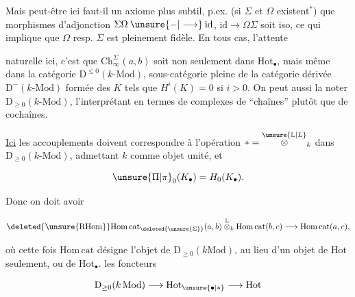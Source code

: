 
Mais peut-être ici faut-il un axiome plus subtil, p.ex. (si $\Sigma$  et $\Omega$ existent$^{*}$) que   morphismes d'adjonction $\Sigma\Omega\mathbin{\unsure{-|\longrightarrow}}\mathrm{id}$, $\mathrm{id}\longrightarrow\Omega\Sigma$ soit iso, ce qui implique que $\Omega$ resp. $\Sigma$ est pleinement fidèle.  En tous cas, l'attente


naturelle ici, c'est que $\mathrm{Ch}_{\infty}^{\Sigma}(a,b)$ soit non seulement dans $\mathrm{Hot}_{\bullet}$, mais même dans la catégorie   $\mathrm{D}^{\leq 0}(k\text{-}\mathrm{Mod})$, sous-catégorie pleine de la catégorie dérivée $\mathrm D^{-}(k\text{-}\mathrm{Mod})$ formée des $K$ tels que $H^i(K)=0$ si $i>0$. On peut aussi la noter $\mathrm D_{\geq 0}(k\text{-}\mathrm{Mod})$, l'interprétant en termes de complexes de ``chaînes'' plutôt que de cochaînes. 

\uline{Ici} les accouplements doivent correspondre à l'opération $*=\overset{\unsure{\mathbb L|L}}{\otimes}_{k}$ dans $\mathrm D_{\geq 0}(k\text{-}\mathrm{Mod})$, admettant $k$ comme objet unité, et

\[
 \unsure{\Pi|\pi}_0(K_\bullet)=H_0(K_\bullet).
\]

Donc on doit avoir 

\[
 \deleted{\unsure{\mathrm{RHom}}}\mathrm{Hom\,cat}_{\deleted{\unsure{\Sigma}}}(a,b)
 \overset{\mathbb L}{\otimes}_k\mathrm{Hom\,cat}(b,c)\longrightarrow\mathrm{Hom\,cat}(a,c),
\]

où cette fois $\mathrm{Hom\,cat}$ désigne l'objet de $\mathrm D_{\geq 0}(k\mathrm{Mod})$, au lieu d'un objet de $\mathrm{Hot}$ seulement, ou de $\mathrm{Hot}_{\bullet}$.  les foncteurs

\[
 \mathrm D_{\geq 0}(k\,\mathrm{Mod})\longrightarrow\mathrm{Hot}_{\unsure{\bullet|*}}\longrightarrow\mathrm{Hot}
\]
